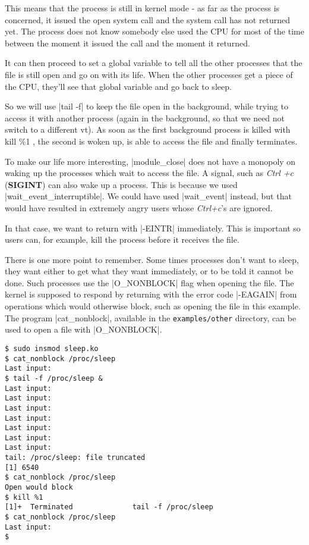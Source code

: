 \documentclass[10pt, oneside]{book}
\begin{document}
This means that the process is still in kernel mode - as far as the process is concerned, it issued the open system call and the system call has not returned yet.
The process does not know somebody else used the CPU for most of the time between the moment it issued the call and the moment it returned.

It can then proceed to set a global variable to tell all the other processes that the file is still open and go on with its life.
When the other processes get a piece of the CPU, they'll see that global variable and go back to sleep.

So we will use \sh|tail -f| to keep the file open in the background, while trying to access it with another process (again in the background, so that we need not switch to a different vt).
As soon as the first background process is killed with kill \%1 , the second is woken up, is able to access the file and finally terminates.

To make our life more interesting, \cpp|module_close| does not have a monopoly on waking up the processes which wait to access the file.
A signal, such as \emph{Ctrl +c} (\textbf{SIGINT}) can also wake up a process. This is because we used \cpp|wait_event_interruptible|.
We could have used \cpp|wait_event| instead, but that would have resulted in extremely angry users whose \emph{Ctrl+c}'s are ignored.

In that case, we want to return with \cpp|-EINTR| immediately. This is important so users can, for example, kill the process before it receives the file.

There is one more point to remember. Some times processes don't want to sleep, they want either to get what they want immediately, or to be told it cannot be done.
Such processes use the \cpp|O_NONBLOCK| flag when opening the file.
The kernel is supposed to respond by returning with the error code \cpp|-EAGAIN| from operations which would otherwise block, such as opening the file in this example. The program \sh|cat_nonblock|, available in the \verb|examples/other| directory, can be used to open a file with \cpp|O_NONBLOCK|.

\begin{verbatim}
$ sudo insmod sleep.ko
$ cat_nonblock /proc/sleep
Last input:
$ tail -f /proc/sleep &
Last input:
Last input:
Last input:
Last input:
Last input:
Last input:
Last input:
tail: /proc/sleep: file truncated
[1] 6540
$ cat_nonblock /proc/sleep
Open would block
$ kill %1
[1]+  Terminated              tail -f /proc/sleep
$ cat_nonblock /proc/sleep
Last input:
$
\end{verbatim}
\end{document}
